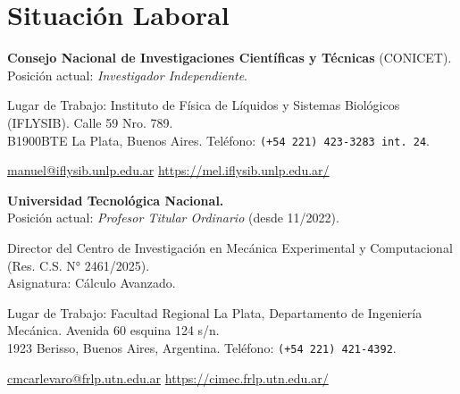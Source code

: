 
\vspace{1.0em}
\hrulefill \vspace{-1.5em}
\section*{Situación Laboral}

\begin{timeline}
 \textbf{Consejo Nacional de Investigaciones Científicas y Técnicas} (CONICET). \\Posición actual: \textit{Investigador Independiente}.

Lugar de Trabajo: Instituto de Física de Líquidos y Sistemas Biológicos (IFLYSIB). Calle 59 Nro. 789.\\ B1900BTE  La Plata, Buenos Aires. Teléfono: \texttt{(+54 221) 423-3283 int. 24}.

	{\color{DimGrey}{\faEnvelope}} \href{mailto:manuel@iflysib.unlp.edu.ar}{manuel@iflysib.unlp.edu.ar} \hspace{1cm}
{\color{DimGrey}{\faGlobeAmericas}} \href{https://mel.iflysib.unlp.edu.ar/}{https://mel.iflysib.unlp.edu.ar/}

   \textbf{Universidad Tecnológica Nacional.} \\
Posición actual: \textit{Profesor Titular Ordinario} (desde 11/2022).

Director del Centro de Investigación en Mecánica Experimental y Computacional (Res. C.S. N° 2461/2025).\\
Asignatura: Cálculo Avanzado.

Lugar de Trabajo: Facultad Regional La Plata, Departamento de Ingeniería Mecánica. Avenida 60 esquina 124 s/n. \\1923 Berisso, Buenos Aires, Argentina. Teléfono: \texttt{(+54 221) 421-4392}.

	{\color{DimGrey}{\faEnvelope}}  \href{mailto:manuel@iflysib.unlp.edu.ar}{cmcarlevaro@frlp.utn.edu.ar} \hspace{1cm}
{\color{DimGrey}{\faGlobeAmericas}} \href{https://cimec.frlp.utn.edu.ar/}{https://cimec.frlp.utn.edu.ar/}
\end{timeline}
